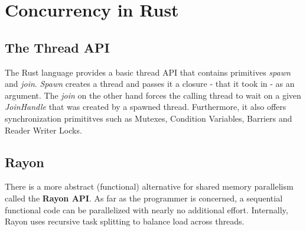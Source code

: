 
\chapter{Concurrency in Rust} %

\label{Chapter2} %



\section{The Thread API}
The Rust language provides a basic thread API that contains primitives \emph{spawn} and \emph{join}. \emph{Spawn} creates a thread and passes it a closure - that it took in - as an argument. The \emph{join} on the other hand forces the calling thread to wait on a given \emph{JoinHandle} that was created by a spawned thread. Furthermore, it also offers synchronization primititves such as Mutexes, Condition Variables, Barriers and Reader Writer Locks.

\section{Rayon}

There is a more abstract (functional) alternative for shared memory parallelism called the \textbf{Rayon API}. As far as the programmer is concerned, a sequential functional code can be parallelized with nearly no additional effort. Internally, Rayon uses recursive task splitting to balance load across threads.

